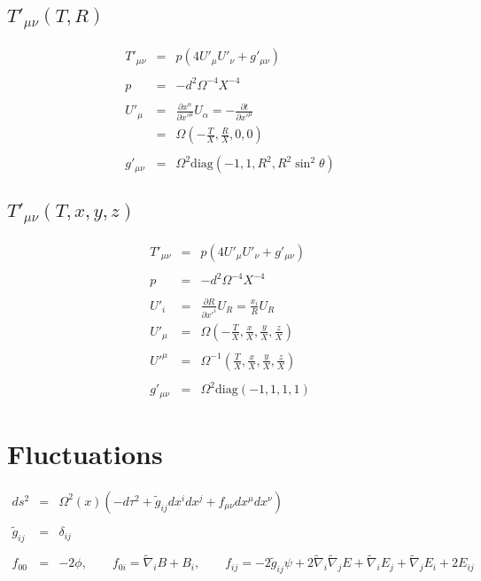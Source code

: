 \documentclass[10pt,letterpaper]{article}
\numberwithin{equation}{section}
\begin{document}
\subsection{$T'_{\mu\nu}(T,R)$}
\begin{eqnarray}
T'_{\mu\nu} &=& p(4U'_\mu U'_\nu + g'_{\mu\nu})
\\ \nonumber\\
p &=& -d^2 \Omega^{-4} X^{-4}
\\ \nonumber\\
U'_{\mu} &=& \frac{\partial x^\alpha}{\partial x'^\mu}U_\alpha = - \frac{\partial t}{\partial x'^\mu}
\nonumber\\
&=&  \Omega \left(-\frac{T}{X},\frac{R}{X},0,0\right) 
\\ \nonumber\\
g'_{\mu\nu} &=& \Omega^2 \text{diag}\left(-1,1,R^2,R^2\sin^2\theta\right)
\end{eqnarray}
%
%
\subsection{$T'_{\mu\nu}(T,x,y,z)$}
\begin{eqnarray}
T'_{\mu\nu} &=& p(4U'_\mu U'_\nu + g'_{\mu\nu})
\\ \nonumber\\
p &=& -d^2 \Omega^{-4} X^{-4}
\\ \nonumber\\
U'_{i} &=& \frac{\partial R}{\partial x'^i} U_R = \frac{x_i}{R}U_R
\nonumber\\
U'_{\mu} &=&  \Omega \left(-\frac{T}{X},\frac{x}{X},\frac{y}{X},\frac{z}{X}\right) 
\\ \nonumber\\
U'^{\mu} &=&  \Omega^{-1} \left(\frac{T}{X},\frac{x}{X},\frac{y}{X},\frac{z}{X}\right) 
\\ \nonumber\\
g'_{\mu\nu} &=& \Omega^2 \text{diag}\left(-1,1,1,1\right)
\end{eqnarray}
%
%
%
%
\section{Fluctuations}
% 
%
\begin{eqnarray}
ds^2 &=& \Omega^2(x)(-d\tau^2 + \tilde g_{ij} dx^i dx^j + f_{\mu\nu} dx^\mu dx^\nu)
\\ \nonumber\\
\tilde g_{ij} &=& \delta_{ij}
\\ \nonumber\\
f_{00} &=& -2\phi,\qquad f_{0i}= \tilde \nabla_i B + B_i,\qquad 
f_{ij} = -2 \tilde g_{ij}\psi + 2\tilde\nabla_i\tilde \nabla_j E + \tilde \nabla_i E_j + \tilde \nabla_j E_i + 2E_{ij}
\end{eqnarray}
%
\end{document}
